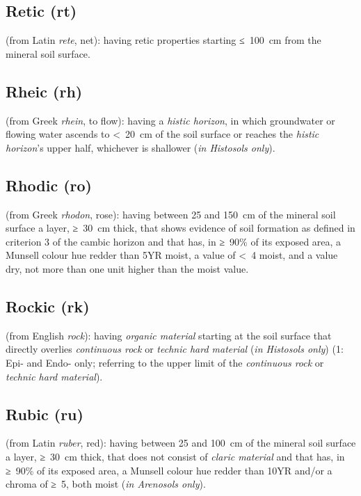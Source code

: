 \documentclass[
  letterpaper,
  DIV=11,
  numbers=noendperiod]{scrreprt}
\begin{document}
\hypertarget{retic-rt}{%
\subsection{Retic (rt)}\label{retic-rt}}

(from Latin \emph{rete}, net): having retic properties starting ≤~100~cm
from the mineral soil surface.

\hypertarget{rheic-rh}{%
\subsection{Rheic (rh)}\label{rheic-rh}}

(from Greek \emph{rhein}, to flow): having a \emph{histic horizon}, in
which groundwater or flowing water ascends to \textless~20~cm of the
soil surface or reaches the \emph{histic horizon}'s upper half,
whichever is shallower (\emph{in Histosols only}).

\hypertarget{rhodic-ro}{%
\subsection{Rhodic (ro)}\label{rhodic-ro}}

(from Greek \emph{rhodon}, rose): having between 25 and 150~cm of the
mineral soil surface a layer, ≥~30~cm thick, that shows evidence of soil
formation as defined in criterion 3 of the cambic horizon and that has,
in ≥~90\% of its exposed area, a Munsell colour hue redder than 5YR
moist, a value of \textless~4 moist, and a value dry, not more than one
unit higher than the moist value.

\hypertarget{rockic-rk}{%
\subsection{Rockic (rk)}\label{rockic-rk}}

(from English \emph{rock}): having \emph{organic material} starting at
the soil surface that directly overlies \emph{continuous rock} or
\emph{technic hard material} (\emph{in Histosols only}) (1: Epi- and
Endo- only; referring to the upper limit of the \emph{continuous rock}
or \emph{technic hard material}).

\hypertarget{rubic-ru}{%
\subsection{Rubic (ru)}\label{rubic-ru}}

(from Latin \emph{ruber}, red): having between 25 and 100~cm of the
mineral soil surface a layer, ≥~30~cm thick, that does not consist of
\emph{claric material} and that has, in ≥~90\% of its exposed area, a
Munsell colour hue redder than 10YR and/or a chroma of ≥~5, both moist
(\emph{in Arenosols only}).
\end{document}

